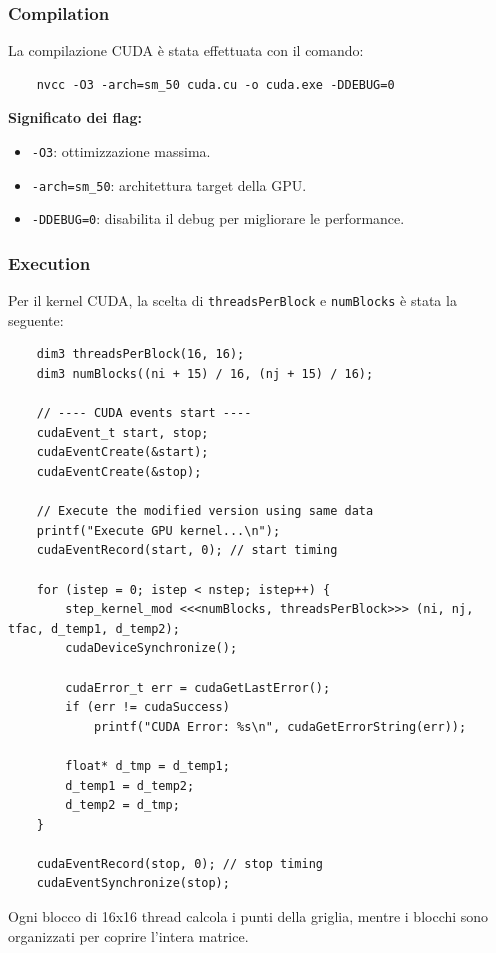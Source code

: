 \subsubsection{Compilation}
La compilazione CUDA è stata effettuata con il comando:

\begin{verbatim}
    nvcc -O3 -arch=sm_50 cuda.cu -o cuda.exe -DDEBUG=0
\end{verbatim}

\textbf{Significato dei flag:}
\begin{itemize}
    \item \texttt{-O3}: ottimizzazione massima.
    \item \texttt{-arch=sm\_50}: architettura target della GPU.
    \item \texttt{-DDEBUG=0}: disabilita il debug per migliorare le performance.
\end{itemize}

\subsubsection{Execution}
Per il kernel CUDA, la scelta di \texttt{threadsPerBlock} e \texttt{numBlocks} è stata la seguente:

\begin{lstlisting}
    dim3 threadsPerBlock(16, 16);
    dim3 numBlocks((ni + 15) / 16, (nj + 15) / 16);

    // ---- CUDA events start ----
    cudaEvent_t start, stop;
    cudaEventCreate(&start);
    cudaEventCreate(&stop);

    // Execute the modified version using same data
    printf("Execute GPU kernel...\n");
    cudaEventRecord(start, 0); // start timing

    for (istep = 0; istep < nstep; istep++) {
        step_kernel_mod <<<numBlocks, threadsPerBlock>>> (ni, nj, tfac, d_temp1, d_temp2);
        cudaDeviceSynchronize();

        cudaError_t err = cudaGetLastError();
        if (err != cudaSuccess)
            printf("CUDA Error: %s\n", cudaGetErrorString(err));
        
        float* d_tmp = d_temp1;
        d_temp1 = d_temp2;
        d_temp2 = d_tmp;
    }

    cudaEventRecord(stop, 0); // stop timing
    cudaEventSynchronize(stop);

\end{lstlisting}

\noindent
Ogni blocco di 16x16 thread calcola i punti della griglia, mentre i blocchi sono organizzati per coprire l'intera matrice.  

